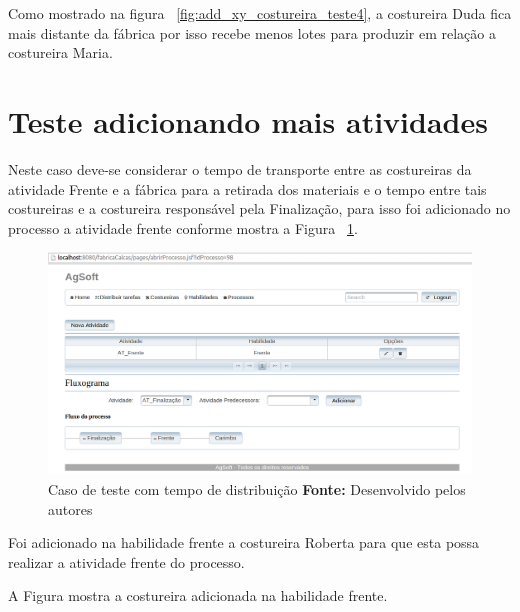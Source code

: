 \par Como mostrado na figura ~\ref{fig:add_xy_costureira_teste4}, a costureira
Duda fica mais distante da fábrica por isso recebe menos lotes para produzir em
relação a costureira Maria.

\section{Teste adicionando mais atividades}

\par Neste caso deve-se considerar o tempo de transporte entre as costureiras da atividade Frente e a fábrica 
para a retirada dos materiais e o tempo entre tais costureiras e a costureira
responsável pela Finalização, para isso foi adicionado no processo a atividade
frente conforme mostra a Figura ~\ref{fig:add_frente_teste4}.


\begin{figure}[h!]
	\centerline{\includegraphics[scale=0.3]{./imagens/adicionar_atividade_frente_teste4.png}}
	\caption[Caso de teste com tempo de distribuição]
	{Caso de teste com tempo de distribuição \textbf{Fonte:} Desenvolvido pelos autores}
	\label{fig:add_frente_teste4}
\end{figure}


\par Foi adicionado na habilidade frente a costureira Roberta para que esta
possa realizar a atividade frente do processo.
\par A Figura mostra a costureira adicionada na habilidade frente.

